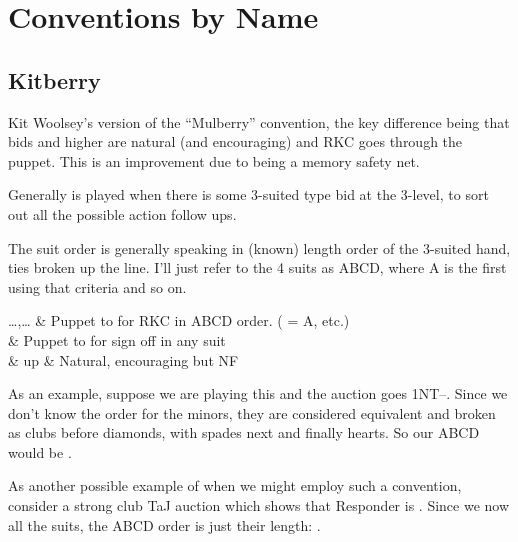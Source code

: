 \documentclass[conventions]{subfiles}
\begin{document}
	
	\chapter{Conventions by Name}
	
	\section{Kitberry}
	\label{Kitberry}
	
	Kit Woolsey's version of the ``Mulberry'' convention, the key difference being that bids  and higher are natural (and encouraging) and RKC goes through the puppet.  This is an improvement due to being a memory safety net.
	
	Generally is played when there is some 3-suited type bid at the 3-level, to sort out all the possible action follow ups.
	
	The suit order is generally speaking in (known) length order of the 3-suited hand, ties broken up the line.  I'll just refer to the 4 suits as ABCD, where A is the first using that criteria and so on.
	
	\begin{bidtable}{\ldots,\ldots}
		 & Puppet to  for RKC in ABCD order.  ( = A, etc.) \\
		 & Puppet to  for sign off in any suit \\
		 \& up & Natural, encouraging but NF \\
	\end{bidtable}

	As an example, suppose we are playing this and the auction goes 1NT--.  Since we don't know the order for the minors, they are considered equivalent and broken as clubs before diamonds, with spades next and finally hearts.  So our ABCD would be \ccc\ddd\sss\hhh.
	
	As another possible example of when we might employ such a convention, consider a strong club TaJ auction which shows that Responder is . Since we now all the suits, the ABCD order is just their length: \ddd\hhh\ccc\sss.
\end{document}
